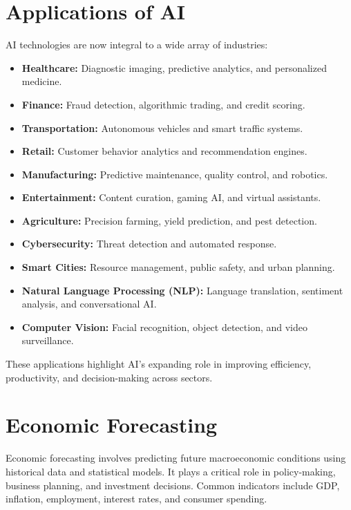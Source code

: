 \section{Applications of AI}
\label{sec:applications-of-ai}

AI technologies are now integral to a wide array of industries:

\begin{itemize}
    \item \textbf{Healthcare:} Diagnostic imaging, predictive analytics, and personalized medicine.
    \item \textbf{Finance:} Fraud detection, algorithmic trading, and credit scoring.
    \item \textbf{Transportation:} Autonomous vehicles and smart traffic systems.
    \item \textbf{Retail:} Customer behavior analytics and recommendation engines.
    \item \textbf{Manufacturing:} Predictive maintenance, quality control, and robotics.
    \item \textbf{Entertainment:} Content curation, gaming AI, and virtual assistants.
    \item \textbf{Agriculture:} Precision farming, yield prediction, and pest detection.
    \item \textbf{Cybersecurity:} Threat detection and automated response.
    \item \textbf{Smart Cities:} Resource management, public safety, and urban planning.
    \item \textbf{Natural Language Processing (NLP):} Language translation, sentiment analysis, and conversational AI.
    \item \textbf{Computer Vision:} Facial recognition, object detection, and video surveillance. \citep{googleai-applications}
\end{itemize}

These applications highlight AI’s expanding role in improving efficiency, productivity, and decision-making across sectors.

\section{Economic Forecasting}
\label{sec:economic-forecasting}

Economic forecasting involves predicting future macroeconomic conditions using historical data and statistical models. It plays a critical role in policy-making, business planning, and investment decisions. Common indicators include GDP, inflation, employment, interest rates, and consumer spending.

